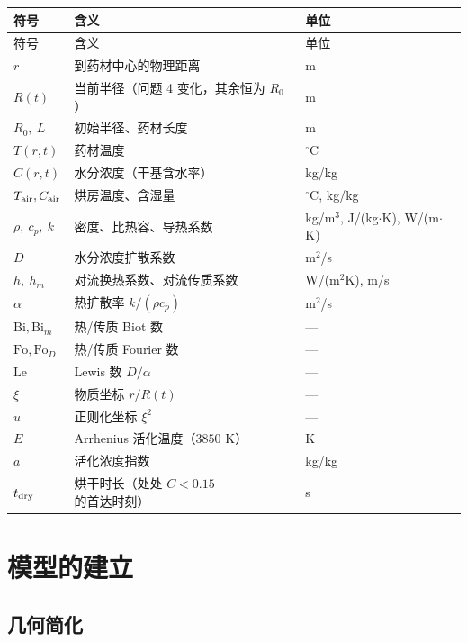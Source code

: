 \documentclass[bwprint]{cumcmthesis}
\begin{document}
\begin{center}
\small
\begin{longtable}{@{}p{2.5cm}p{8.4cm}p{3.5cm}@{}}
\toprule
符号 & 含义 & 单位 \\
\midrule
\endfirsthead
\toprule
符号 & 含义 & 单位 \\
\midrule
\endhead
$r$ & 到药材中心的物理距离 & m \\
$R(t)$ & 当前半径（问题 4 变化，其余恒为 $R_0$） & m \\
$R_0,\ L$ & 初始半径、药材长度 & m \\
$T(r,t)$ & 药材温度 & $^\circ$C \\
$C(r,t)$ & 水分浓度（干基含水率） & kg/kg \\
$T_{\rm air},C_{\rm air}$ & 烘房温度、含湿量 & $^\circ$C, kg/kg \\
$\rho,\ c_p,\ k$ & 密度、比热容、导热系数 & kg/m$^3$, J/(kg$\cdot$K), W/(m$\cdot$K) \\
$D$ & 水分浓度扩散系数 & m$^2$/s \\
$h,\ h_m$ & 对流换热系数、对流传质系数 & W/(m$^2$K), m/s \\
$\alpha$ & 热扩散率 $k/(\rho c_p)$ & m$^2$/s \\
$\mathrm{Bi},\mathrm{Bi}_m$ & 热/传质 Biot 数 & --- \\
$\mathrm{Fo},\mathrm{Fo}_D$ & 热/传质 Fourier 数 & --- \\
$\mathrm{Le}$ & Lewis 数 $D/\alpha$ & --- \\
$\xi$ & 物质坐标 $r/R(t)$ & --- \\
$u$ & 正则化坐标 $\xi^2$ & --- \\
$E$ & Arrhenius 活化温度（$3850$ K） & K \\
$a$ & 活化浓度指数 & kg/kg \\
$t_{\rm dry}$ & 烘干时长（处处 $C<0.15$ 的首达时刻） & s \\
\bottomrule
\end{longtable}
\end{center}

\section{模型的建立}

\subsection{几何简化}
\end{document}
